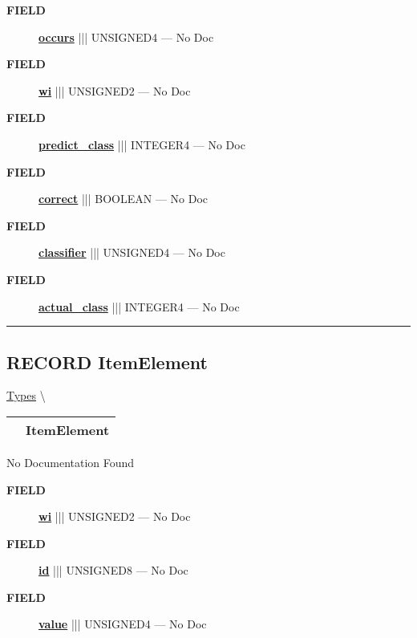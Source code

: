 \par
\begin{description}
\item [\colorbox{tagtype}{\color{white} \textbf{\textsf{FIELD}}}] \textbf{\underline{occurs}} ||| UNSIGNED4 --- No Doc
\item [\colorbox{tagtype}{\color{white} \textbf{\textsf{FIELD}}}] \textbf{\underline{wi}} ||| UNSIGNED2 --- No Doc
\item [\colorbox{tagtype}{\color{white} \textbf{\textsf{FIELD}}}] \textbf{\underline{predict\_class}} ||| INTEGER4 --- No Doc
\item [\colorbox{tagtype}{\color{white} \textbf{\textsf{FIELD}}}] \textbf{\underline{correct}} ||| BOOLEAN --- No Doc
\item [\colorbox{tagtype}{\color{white} \textbf{\textsf{FIELD}}}] \textbf{\underline{classifier}} ||| UNSIGNED4 --- No Doc
\item [\colorbox{tagtype}{\color{white} \textbf{\textsf{FIELD}}}] \textbf{\underline{actual\_class}} ||| INTEGER4 --- No Doc
\end{description}





\rule{\linewidth}{0.5pt}
\subsection*{\textsf{\colorbox{headtoc}{\color{white} RECORD}
ItemElement}}

\hypertarget{ecldoc:ml_core.types.itemelement}{}
\hspace{0pt} \hyperlink{ecldoc:ML_Core.Types}{Types} \textbackslash 

{\renewcommand{\arraystretch}{1.5}
\begin{tabularx}{\textwidth}{|>{\raggedright\arraybackslash}l|X|}
\hline
\hspace{0pt}\mytexttt{\color{red} } & \textbf{ItemElement} \\
\hline
\end{tabularx}
}

\par





No Documentation Found







\par
\begin{description}
\item [\colorbox{tagtype}{\color{white} \textbf{\textsf{FIELD}}}] \textbf{\underline{wi}} ||| UNSIGNED2 --- No Doc
\item [\colorbox{tagtype}{\color{white} \textbf{\textsf{FIELD}}}] \textbf{\underline{id}} ||| UNSIGNED8 --- No Doc
\item [\colorbox{tagtype}{\color{white} \textbf{\textsf{FIELD}}}] \textbf{\underline{value}} ||| UNSIGNED4 --- No Doc
\end{description}





